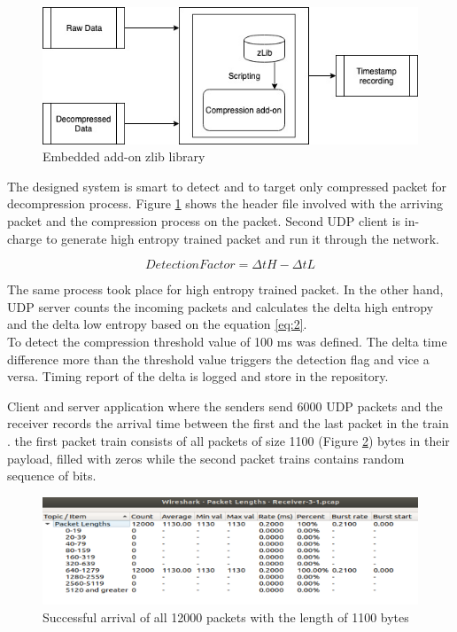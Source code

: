 \documentclass[sigconf]{acmart}
\begin{document}
 \begin{figure}[h]
  \centering
  \includegraphics[width=\linewidth]{zlib}
  \caption{Embedded add-on zlib library }
  \label{zlib}
\end{figure} 

The designed system is smart to detect and to target only compressed packet for decompression process. Figure \ref{zlib} shows the header file involved with the arriving packet and the compression process on the packet. 
Second UDP client is in-charge to generate high entropy trained packet and run it through the network. 

\begin{equation}
 	DetectionFactor = \Delta tH - \Delta tL \label{eq:2}
\end{equation}


The same process took place for high entropy trained packet. In the other hand, UDP server counts the incoming packets and calculates the delta high entropy and the delta low entropy based on the equation \ref{eq:2}.\\
To detect the compression threshold value of 100 ms was defined.  The delta time difference more than the threshold value triggers the detection flag and vice a versa. Timing report of the delta is logged and store in the repository.  
 
Client and server application where the senders send 6000 UDP packets and the receiver records the arrival time between the first and the last packet in the train . the first packet train consists of all packets of size 1100 (Figure \ref{length}) bytes in their payload, filled with zeros while the second packet trains contains random sequence of bits.

 \begin{figure}[h]
  \centering
  \includegraphics[width=\linewidth]{packet_length}
  \caption{Successful arrival of all 12000 packets with the length of 1100 bytes }
  \label{length}
\end{figure} 
\end{document}
